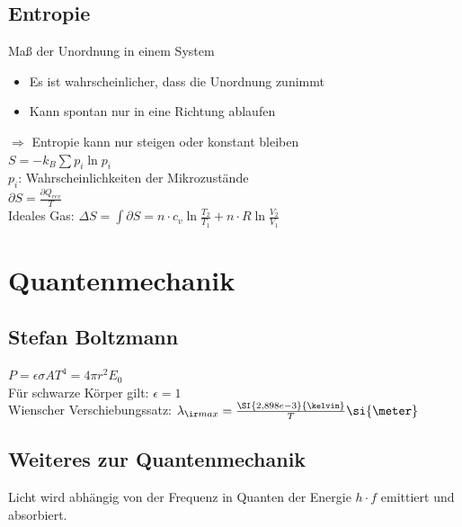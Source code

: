 \documentclass[german]{latex4ei/latex4ei_sheet}
\begin{document}
\subsection{Entropie}
Maß der Unordnung in einem System
\begin{itemize}
	\item Es ist wahrscheinlicher, dass die Unordnung zunimmt
	\item Kann spontan nur in eine Richtung ablaufen
\end{itemize}
$\Rightarrow$ Entropie kann nur steigen oder konstant bleiben\\
$S=-k_B\sum p_i \ln p_i$ \\ 
$p_i$: Wahrscheinlichkeiten der Mikrozustände\\
$\partial S = \frac{\partial Q_{rev}}{T}$\\
Ideales Gas: $\Delta S= \int \partial S = n \cdot c_v \ln \frac{T_2}{T_1}+n\cdot R \ln \frac{V_2}{V_1}$



\section{Quantenmechanik}
\subsection{Stefan Boltzmann}
$P=\epsilon \sigma A T^4 = 4 \pi r^2 E_0$\\
Für schwarze Körper gilt: $\epsilon = 1$\\
Wienscher Verschiebungssatz: $\lambda_{\ir max}=\frac{\SI{2,898e-3}{\kelvin}}{T} \si{\meter}$
\subsection{Weiteres zur Quantenmechanik}
Licht wird abhängig von der Frequenz in Quanten der Energie $h\cdot f$ emittiert und absorbiert.
\end{document}
